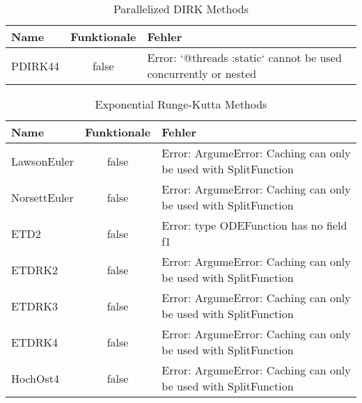 \begin{table}[H]
    \centering

    \begin{tabular}{p{5cm}|c|p{5cm}}
        Name & Funktionale & Fehler \\
        \hline\hline
        PDIRK44 & false & Error: `@threads :static` cannot be used concurrently or nested \\     
    \end{tabular}
    \caption{Parallelized DIRK Methods}
    \label{tab:my_label}
\end{table}

\begin{table}[H]
    \centering

    \begin{tabular}{p{5cm}|c|p{5cm}}
        Name & Funktionale & Fehler \\
        \hline\hline
        LawsonEuler  & false & Error: ArgumeError: Caching can only be used with SplitFunction \\
        NorsettEuler & false & Error: ArgumeError: Caching can only be used with SplitFunction \\
        ETD2         & false & Error: type ODEFunction has no field f1 \\
        ETDRK2       & false & Error: ArgumeError: Caching can only be used with SplitFunction \\
        ETDRK3       & false & Error: ArgumeError: Caching can only be used with SplitFunction \\
        ETDRK4       & false & Error: ArgumeError: Caching can only be used with SplitFunction \\
        HochOst4     & false & Error: ArgumeError: Caching can only be used with SplitFunction \\
    \end{tabular}
    \caption{Exponential Runge-Kutta Methods}
    \label{tab:my_label}
\end{table}


